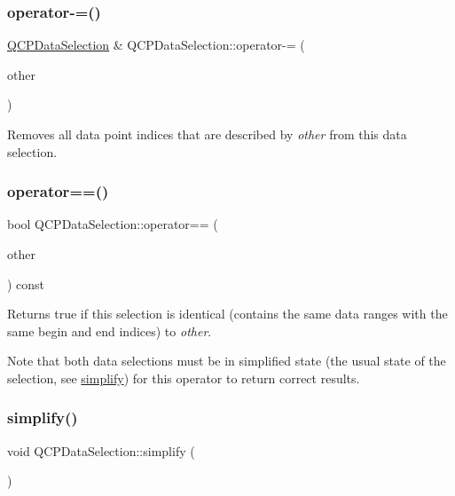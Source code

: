 \subsubsection{\texorpdfstring{operator-\/=()}{operator-=()}\hspace{0.1cm}{\footnotesize\ttfamily [2/2]}}
{\footnotesize\ttfamily \hyperlink{class_q_c_p_data_selection}{Q\+C\+P\+Data\+Selection} \& Q\+C\+P\+Data\+Selection\+::operator-\/= (\begin{DoxyParamCaption}\item[{const \hyperlink{class_q_c_p_data_range}{Q\+C\+P\+Data\+Range} \&}]{other }\end{DoxyParamCaption})}

Removes all data point indices that are described by {\itshape other} from this data selection. \mbox{\label{class_q_c_p_data_selection_a664fa566569b17148abafd6b1dbbf347}} 
\subsubsection{\texorpdfstring{operator==()}{operator==()}}
{\footnotesize\ttfamily bool Q\+C\+P\+Data\+Selection\+::operator== (\begin{DoxyParamCaption}\item[{const \hyperlink{class_q_c_p_data_selection}{Q\+C\+P\+Data\+Selection} \&}]{other }\end{DoxyParamCaption}) const}

Returns true if this selection is identical (contains the same data ranges with the same begin and end indices) to {\itshape other}.

Note that both data selections must be in simplified state (the usual state of the selection, see \hyperlink{class_q_c_p_data_selection_a4a2fbad1a6e4d1dd26fdfdf88956f2a4}{simplify}) for this operator to return correct results. \mbox{\label{class_q_c_p_data_selection_a4a2fbad1a6e4d1dd26fdfdf88956f2a4}} 
\subsubsection{\texorpdfstring{simplify()}{simplify()}}
{\footnotesize\ttfamily void Q\+C\+P\+Data\+Selection\+::simplify (\begin{DoxyParamCaption}{ }\end{DoxyParamCaption})}

